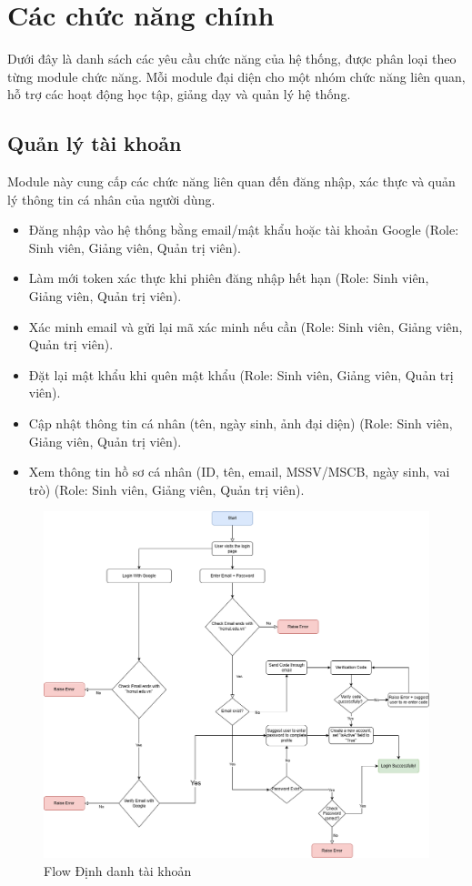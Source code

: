 \section{Các chức năng chính}
Dưới đây là danh sách các yêu cầu chức năng của hệ thống, được phân loại theo từng module chức năng. Mỗi module đại diện cho một nhóm chức năng liên quan, hỗ trợ các hoạt động học tập, giảng dạy và quản lý hệ thống.

\subsection{Quản lý tài khoản}
Module này cung cấp các chức năng liên quan đến đăng nhập, xác thực và quản lý thông tin cá nhân của người dùng.
\begin{itemize}[label=--]
    \item Đăng nhập vào hệ thống bằng email/mật khẩu hoặc tài khoản Google (Role: Sinh viên, Giảng viên, Quản trị viên).
    \item Làm mới token xác thực khi phiên đăng nhập hết hạn (Role: Sinh viên, Giảng viên, Quản trị viên).
    \item Xác minh email và gửi lại mã xác minh nếu cần (Role: Sinh viên, Giảng viên, Quản trị viên).
    \item Đặt lại mật khẩu khi quên mật khẩu (Role: Sinh viên, Giảng viên, Quản trị viên).
    \item Cập nhật thông tin cá nhân (tên, ngày sinh, ảnh đại diện) (Role: Sinh viên, Giảng viên, Quản trị viên).
    \item Xem thông tin hồ sơ cá nhân (ID, tên, email, MSSV/MSCB, ngày sinh, vai trò) (Role: Sinh viên, Giảng viên, Quản trị viên).
\end{itemize}

\begin{figure}[H]
    \centering
    \includegraphics[width=0.9\linewidth]{images/Quan_ly_tai_khoan/authenFlow.drawio.png}
    \caption{Flow Định danh tài khoản}
    \label{fig:enter-label}
\end{figure}

